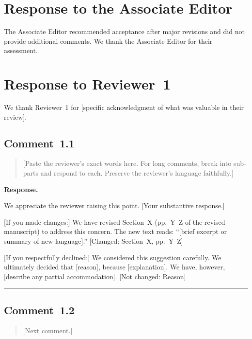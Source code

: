 \documentclass[11pt]{article}
\newenvironment{reviewercomment}{%
  \begin{quote}\color{ReviewerBlue}\itshape
}{%
  \end{quote}
}
\newenvironment{response}{%
  \noindent\textbf{Response.}\quad\ignorespaces
}{%
  \par\medskip
}
\newcommand{\changed}[1]{\textcolor{OliveGreen}{[Changed: #1]}}
\newcommand{\declined}[1]{\textcolor{BrickRed}{[Not changed: #1]}}
\newcommand{\pointsep}{\bigskip\noindent\rule{\textwidth}{0.4pt}\medskip}
\begin{document}
\section*{Response to the Associate Editor}

The Associate Editor recommended acceptance after major revisions and did not
provide additional comments. We thank the Associate Editor for their
assessment.

\section*{Response to Reviewer~1}

We thank Reviewer~1 for [specific acknowledgment of what was valuable in
their review].

\subsection*{Comment~1.1}

\begin{reviewercomment}
[Paste the reviewer's exact words here. For long comments, break into
sub-parts and respond to each. Preserve the reviewer's language faithfully.]
\end{reviewercomment}

\begin{response}
We appreciate the reviewer raising this point. [Your substantive response.]

[If you made changes:] We have revised Section~X (pp.~Y--Z of the revised
manuscript) to address this concern. The new text reads: ``[brief excerpt or
summary of new language].'' \changed{Section~X, pp.~Y--Z}

[If you respectfully declined:] We considered this suggestion carefully. We
ultimately decided that [reason], because [explanation]. We have, however,
[describe any partial accommodation]. \declined{Reason}
\end{response}

\pointsep

\subsection*{Comment~1.2}

\begin{reviewercomment}
[Next comment.]
\end{reviewercomment}
\end{document}
